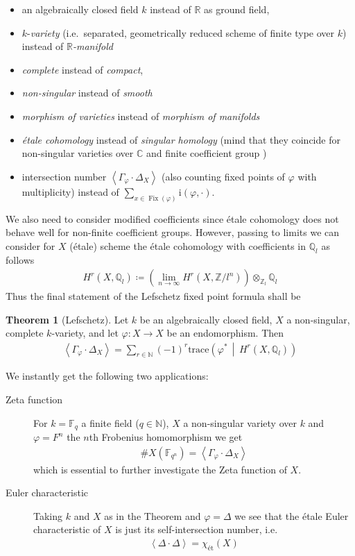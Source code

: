 \documentclass[english]{scrartcl}
\theoremstyle{definition}
\newtheorem{Thm}[Def]{Theorem}
\theoremstyle{remark}
\newcommand*{\N}{\mathds{N}}
\newcommand*{\Z}{\mathds{Z}}
\newcommand*{\Q}{\mathds{Q}}
\newcommand*{\R}{\mathds{R}}
\newcommand*{\C}{\mathds{C}}
\newcommand*{\F}{\mathds{F}}
\newcommand*{\Zmod}[1]{\Z/#1} %
\newcommand*{\Zl}{\Z_l} %
\newcommand*{\Ql}{\Q_l} %
\newcommand*{\idest}{i.e.\ }
\newcommand*{\intProd}[2]{{#1\cdot#2}} %
\newcommand*{\intNum}[1]{{\left\langle{#1}\right\rangle}} %
\newcommand*{\Graph}[1]{{\Gamma_{#1}}} %
\newcommand*{\Diag}[1]{{\Delta_{#1}}} %
\newcommand*{\trace}[2]{{\text{trace}\left(#1 \,\middle|\, #2 \right)}} %
\renewcommand*{\phi}{\varphi}
\begin{document}
\begin{itemize}
\item an algebraically closed field $k$ instead of $\R$ as ground field,
\item $k$-\emph{variety}
  (\idest separated, geometrically reduced scheme of finite type over $k$)
  instead of \emph{$\R$-manifold}
\item \emph{complete} instead of \emph{compact},
\item \emph{non-singular} instead of \emph{smooth}
\item \emph{morphism of varieties} instead of \emph{morphism of manifolds}
\item \emph{étale cohomology} instead of \emph{singular homology}
  (mind that they coincide for non-singular varieties over $\C$ and
  finite coefficient group \cite[see][Thm.~21.1]{milne})
\item intersection number $\intNum{\intProd{\Graph{\phi}}{\Diag{X}}}$
  (also counting fixed points of $\phi$ with multiplicity)
  instead of $\sum_{x\in\operatorname{Fix}(\phi)}\mathrm{i}(\phi,\cdot)$.
\end{itemize}
We also need to consider modified coefficients since étale cohomology
does not behave well for non-finite coefficient groups. However,
passing to limits we can consider for $X$ (étale) scheme the étale
cohomology with coefficients in $\Ql$ as follows
\begin{gather*}
  H^r(X,\Ql)\coloneqq
  \left(\lim_{n\to\infty}H^r(X,\Zmod{l^n})\right)\otimes_{\Zl}\Ql
\end{gather*}
Thus the final statement of the Lefschetz fixed point formula shall be
\begin{Thm}[Lefschetz]\label{lefschetzthm:motivation}
  Let $k$ be an algebraically closed field, $X$ a non-singular,
  complete $k$-variety, and let $\phi\colon X\to X$ be an
  endomorphism. Then
  \begin{gather*}
    \intNum{\intProd{\Graph{\phi}}{\Diag{X}}}
    = \sum_{r\in\N}(-1)^r\trace{\phi^*}{H^r(X,\Ql)}
  \end{gather*}
\end{Thm}

We instantly get the following two applications:
\begin{description}
\item[Zeta function] For
  $k=\F_{q}$ a finite field ($q\in\N$),
  $X$ a non-singular variety over $k$ and
  $\phi=F^n$ the $n$th Frobenius homomorphism
  we get
  \begin{gather*}
    \#X(\F_{q^n}) = \intNum{\intProd{\Graph\phi}{\Diag X}}
  \end{gather*}
  which is essential to further investigate the Zeta function of $X$.
\item[Euler characteristic] Taking $k$ and $X$ as in the Theorem and
  $\phi=\Delta$ we see that the étale Euler characteristic of $X$ is
  just its self-intersection number, \idest
  \begin{gather*}
    \intNum{\intProd{\Delta}{\Delta}} = \chi_{\text{ét}}(X)
  \end{gather*}
\end{description}
\end{document}
